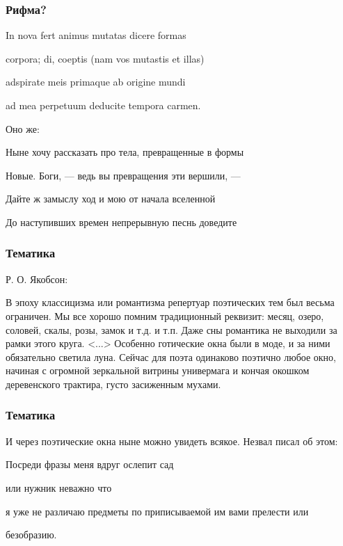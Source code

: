 \documentclass{beamer}
\begin{document}

\begin{frame}
\frametitle{Рифма?}

In nova fert animus mutatas dicere formas

corpora; di, coeptis (nam vos mutastis et illas)

adspirate meis primaque ab origine mundi

ad mea perpetuum deducite tempora carmen.

\begin{center}
Оно же:
\end{center}


Ныне хочу рассказать про тела, превращенные в формы

Новые. Боги, — ведь  вы превращения эти вершили, —

Дайте ж замыслу ход и мою от начала вселенной

До наступивших времен непрерывную песнь доведите

\end{frame}


\begin{frame}
\frametitle{Тематика}

Р. О. Якобсон:

В эпоху классицизма или романтизма репертуар поэтических тем был весьма ограничен. Мы все хорошо помним традиционный реквизит: месяц, озеро, соловей, скалы, розы, замок и т.д. и т.п. Даже сны романтика не выходили за рамки этого круга. <...>  Особенно готические окна были в моде, и за ними обязательно светила луна. Сейчас для поэта одинаково поэтично любое окно, начиная с огромной зеркальной витрины универмага и кончая окошком деревенского трактира, густо засиженным мухами. 

\end{frame}


\begin{frame}
\frametitle{Тематика}

И через поэтические окна ныне можно увидеть всякое. Незвал писал об этом:
\begin{flushleft}

Посреди фразы меня вдруг ослепит сад

или нужник неважно что

я уже не различаю предметы по приписываемой им вами прелести или

безобразию.

\end{flushleft}

\end{frame}
\end{document}
